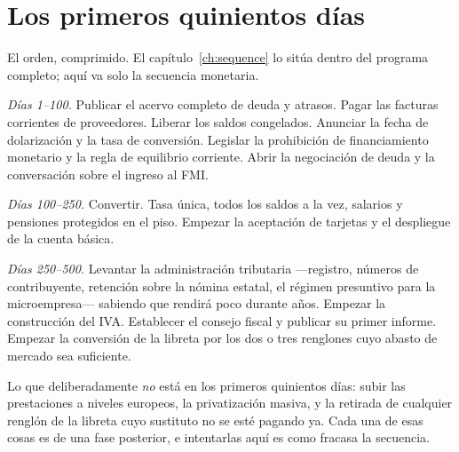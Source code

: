 \section{Los primeros quinientos días}

El orden, comprimido. El capítulo~\ref{ch:sequence} lo sitúa dentro del programa
completo; aquí va solo la secuencia monetaria.

\emph{Días 1--100.} Publicar el acervo completo de deuda y atrasos. Pagar las facturas
corrientes de proveedores. Liberar los saldos congelados. Anunciar la fecha de
dolarización y la tasa de conversión. Legislar la prohibición de financiamiento
monetario y la regla de equilibrio corriente. Abrir la negociación de deuda y la
conversación sobre el ingreso al FMI.

\emph{Días 100--250.} Convertir. Tasa única, todos los saldos a la vez, salarios y
pensiones protegidos en el piso. Empezar la aceptación de tarjetas y el despliegue de la
cuenta básica.

\emph{Días 250--500.} Levantar la administración tributaria ---registro, números de
contribuyente, retención sobre la nómina estatal, el régimen presuntivo para la
microempresa--- sabiendo que rendirá poco durante años. Empezar la construcción del IVA.
Establecer el consejo fiscal y publicar su primer informe. Empezar la conversión de la
libreta por los dos o tres renglones cuyo abasto de mercado sea suficiente.

Lo que deliberadamente \emph{no} está en los primeros quinientos días: subir las
prestaciones a niveles europeos, la privatización masiva, y la retirada de cualquier
renglón de la libreta cuyo sustituto no se esté pagando ya. Cada una de esas cosas es de
una fase posterior, e intentarlas aquí es como fracasa la secuencia.
